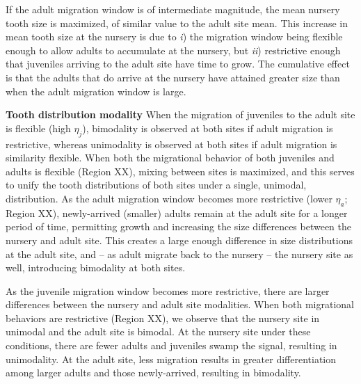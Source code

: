 \documentclass[]{rsos}%
\begin{document}
If the adult migration window is of intermediate magnitude, the mean nursery tooth size is maximized, of similar value to the adult site mean.
This increase in mean tooth size at the nursery is due to \emph{i}) the migration window being flexible enough to allow adults to accumulate at the nursery, but \emph{ii}) restrictive enough that juveniles arriving to the adult site have time to grow.
The cumulative effect is that the adults that do arrive at the nursery have attained greater size than when the adult migration window is large.

\textbf{Tooth distribution modality}
When the migration of juveniles to the adult site is flexible (high $\eta_j$), bimodality is observed at both sites if adult migration is restrictive, whereas unimodality is observed at both sites if adult migration is similarity flexible.
When both the migrational behavior of both juveniles and adults is flexible (Region XX), mixing between sites is maximized, and this serves to unify the tooth distributions of both sites under a single, unimodal, distribution.
As the adult migration window becomes more restrictive (lower $\eta_a$; Region XX), newly-arrived (smaller) adults remain at the adult site for a longer period of time, permitting growth and increasing the size differences between the nursery and adult site.
This creates a large enough difference in size distributions at the adult site, and -- as adult migrate back to the nursery -- the nursery site as well, introducing bimodality at both sites.

As the juvenile migration window becomes more restrictive, there are larger differences between the nursery and adult site modalities.
When both migrational behaviors are restrictive (Region XX), we observe that the nursery site in unimodal and the adult site is bimodal.
At the nursery site under these conditions, there are fewer adults and juveniles swamp the signal, resulting in unimodality.
At the adult site, less migration results in greater differentiation among larger adults and those newly-arrived, resulting in bimodality.




\end{document}

